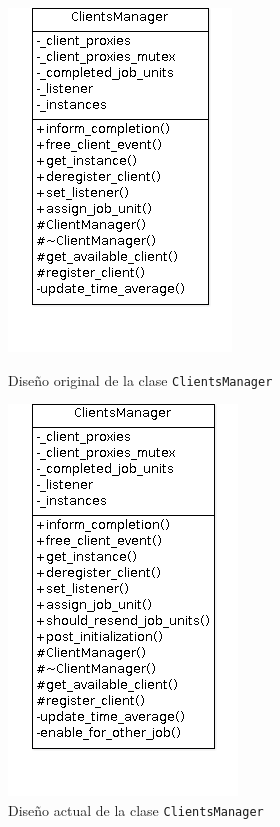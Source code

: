 \begin{figure}[H]
	\hfill
	\begin{minipage}[t]{.4\textwidth}
		\begin{center}
	  		\includegraphics[scale=0.65]{images/ClientsManager-orig.png}
			\caption{Diseño original de la clase \texttt{ClientsManager}}
			\label{fig:ClientsManager:orig}
		\end{center}
	\end{minipage}
	\hfill
	\begin{minipage}[t]{.4\textwidth}
		\begin{center}
	  		\includegraphics[scale=0.65]{images/ClientsManager-actual.png}
			\caption{Diseño actual de la clase \texttt{ClientsManager}}
			\label{fig:ClientsManager:actual}
		\end{center}
	\end{minipage}
	
\end{figure}

